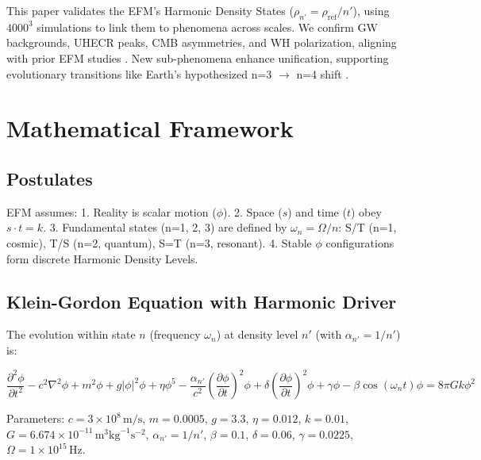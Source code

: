 \documentclass[11pt]{article}
\begin{document}
This paper validates the EFM’s Harmonic Density States (\(\rho_{n'} = \rho_{\text{ref}}/n'\)), using \(4000^3\) simulations to link them to phenomena across scales. We confirm GW backgrounds, UHECR peaks, CMB asymmetries, and WH polarization, aligning with prior EFM studies \citep{EFM_Unifying_Cosmo, EFM_UHECR_Source}. New sub-phenomena enhance unification, supporting evolutionary transitions like Earth’s hypothesized n=3 \(\to\) n=4 shift \citep{EFM_Consciousness}.

\section{Mathematical Framework}
\subsection{Postulates}
EFM assumes: 
1. Reality is scalar motion (\(\phi\)).
2. Space (\(s\)) and time (\(t\)) obey \(s \cdot t = k\).
3. Fundamental states (n=1, 2, 3) are defined by \(\omega_n = \Omega/n\): S/T (n=1, cosmic), T/S (n=2, quantum), S=T (n=3, resonant).
4. Stable \(\phi\) configurations form discrete Harmonic Density Levels.

\subsection{Klein-Gordon Equation with Harmonic Driver}
The evolution within state \(n\) (frequency \(\omega_n\)) at density level \(n'\) (with \(\alpha_{n'} = 1/n'\)) is:

\begin{equation}
\frac{\partial^2 \phi}{\partial t^2} - c^2 \nabla^2 \phi + m^2 \phi + g |\phi|^2 \phi + \eta \phi^5 - \frac{\alpha_{n'}}{c^2} \left(\frac{\partial \phi}{\partial t}\right)^2 \phi + \delta \left(\frac{\partial \phi}{\partial t}\right)^2 \phi + \gamma \phi - \beta \cos(\omega_n t) \phi = 8 \pi G k \phi^2
\label{eq:kge_harmonic}
\end{equation}

Parameters: \(c = 3 \times 10^8 \, \text{m/s}\), \(m = 0.0005\), \(g = 3.3\), \(\eta = 0.012\), \(k = 0.01\), \(G = 6.674 \times 10^{-11} \, \text{m}^3 \text{kg}^{-1} \text{s}^{-2}\), \(\alpha_{n'} = 1/n'\), \(\beta = 0.1\), \(\delta = 0.06\), \(\gamma = 0.0225\), \(\Omega = 1 \times 10^{15} \, \text{Hz}\).
\end{document}

